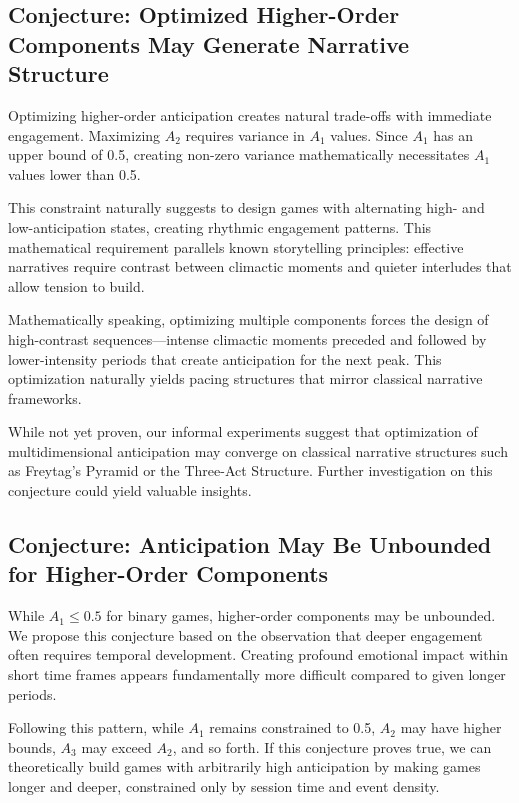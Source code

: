 \documentclass{article}
\begin{document}
\subsection{Conjecture: Optimized Higher-Order Components May Generate Narrative Structure}

Optimizing higher-order anticipation creates natural trade-offs with immediate engagement. Maximizing $A_2$ requires variance in $A_1$ values. Since $A_1$ has an upper bound of 0.5, creating non-zero variance mathematically necessitates $A_1$ values lower than 0.5.

This constraint naturally suggests to design games with alternating high- and low-anticipation states, creating rhythmic engagement patterns. This mathematical requirement parallels known storytelling principles: effective narratives require contrast between climactic moments and quieter interludes that allow tension to build.

Mathematically speaking, optimizing multiple components forces the design of high-contrast sequences—intense climactic moments preceded and followed by lower-intensity periods that create anticipation for the next peak. This optimization naturally yields pacing structures that mirror classical narrative frameworks.

While not yet proven, our informal experiments suggest that optimization of multidimensional anticipation may converge on classical narrative structures such as Freytag's Pyramid or the Three-Act Structure.
Further investigation on this conjecture could yield valuable insights.

\subsection{Conjecture: Anticipation May Be Unbounded for Higher-Order Components}

While $A_1 \leq 0.5$ for binary games, higher-order components may be unbounded. We propose this conjecture based on the observation that deeper engagement often requires temporal development. Creating profound emotional impact within short time frames appears fundamentally more difficult compared to given longer periods.

Following this pattern, while $A_1$ remains constrained to 0.5, $A_2$ may have higher bounds, $A_3$ may exceed $A_2$, and so forth. If this conjecture proves true, we can theoretically build games with arbitrarily high anticipation by making games longer and deeper, constrained only by session time and event density.
\end{document}
